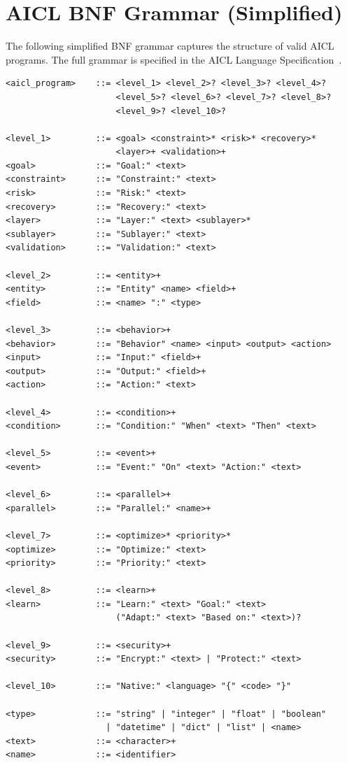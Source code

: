 \documentclass[11pt]{article}
\newcommand{\aicl}{\textsc{AICL}}
\begin{document}
\newpage
\appendix
\section{AICL BNF Grammar (Simplified)}
\label{app:bnf}

The following simplified BNF grammar captures the structure of valid \aicl{} programs. The full grammar is specified in the \aicl{} Language Specification~\citep{philippeantoine2026spec}.

\begin{verbatim}
<aicl_program>    ::= <level_1> <level_2>? <level_3>? <level_4>?
                      <level_5>? <level_6>? <level_7>? <level_8>?
                      <level_9>? <level_10>?

<level_1>         ::= <goal> <constraint>* <risk>* <recovery>*
                      <layer>+ <validation>+
<goal>            ::= "Goal:" <text>
<constraint>      ::= "Constraint:" <text>
<risk>            ::= "Risk:" <text>
<recovery>        ::= "Recovery:" <text>
<layer>           ::= "Layer:" <text> <sublayer>*
<sublayer>        ::= "Sublayer:" <text>
<validation>      ::= "Validation:" <text>

<level_2>         ::= <entity>+
<entity>          ::= "Entity" <name> <field>+
<field>           ::= <name> ":" <type>

<level_3>         ::= <behavior>+
<behavior>        ::= "Behavior" <name> <input> <output> <action>
<input>           ::= "Input:" <field>+
<output>          ::= "Output:" <field>+
<action>          ::= "Action:" <text>

<level_4>         ::= <condition>+
<condition>       ::= "Condition:" "When" <text> "Then" <text>

<level_5>         ::= <event>+
<event>           ::= "Event:" "On" <text> "Action:" <text>

<level_6>         ::= <parallel>+
<parallel>        ::= "Parallel:" <name>+

<level_7>         ::= <optimize>* <priority>*
<optimize>        ::= "Optimize:" <text>
<priority>        ::= "Priority:" <text>

<level_8>         ::= <learn>+
<learn>           ::= "Learn:" <text> "Goal:" <text>
                      ("Adapt:" <text> "Based on:" <text>)?

<level_9>         ::= <security>+
<security>        ::= "Encrypt:" <text> | "Protect:" <text>

<level_10>        ::= "Native:" <language> "{" <code> "}"

<type>            ::= "string" | "integer" | "float" | "boolean"
                    | "datetime" | "dict" | "list" | <name>
<text>            ::= <character>+
<name>            ::= <identifier>
\end{verbatim}
\end{document}
